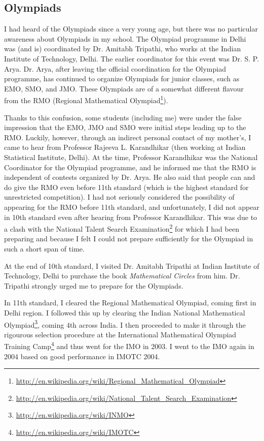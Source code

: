 \documentclass[a4paper]{amsart}
\begin{document}
\subsection{Olympiads}

I had heard of the Olympiads since a very young age, but there was no
particular awareness about Olympiads in my school. The Olympiad
programme in Delhi was (and is) coordinated by Dr. Amitabh Tripathi,
who works at the Indian Institute of Technology, Delhi. The earlier
coordinator for this event was Dr. S. P. Arya. Dr. Arya, after leaving
the official coordination for the Olympiad programme, has continued to
organize Olympiads for junior classes, such as EMO, SMO, and
JMO. These Olympiads are of a somewhat different flavour from the RMO
(Regional Mathematical Olympiad\footnote{\url{http://en.wikipedia.org/wiki/Regional_Mathematical_Olympiad}}).

Thanks to this confusion, some students (including me) were under the
false impression that the EMO, JMO and SMO were initial steps leading up
to the RMO. Luckily, however, through an indirect personal contact of
my mother's, I came to hear from Professor Rajeeva L. Karandhikar
(then working at Indian Statistical Institute, Delhi). At the time,
Professor Karandhikar was the National Coordinator for the Olympiad
programme, and he informed me that the RMO is independent of contests
organized by Dr. Arya. He also said that people can and do give the
RMO even before 11th standard (which is the highest standard for
unrestricted competition).  I had not seriously considered the
possibility of appearing for the RMO before 11th standard, and
unfortunately, I did not appear in 10th standard even after hearing
from Professor Karandhikar. This was due to a clash with the National
Talent Search
Examination\footnote{\url{http://en.wikipedia.org/wiki/National_Talent_Search_Examination}}
for which I had been preparing and because I felt I could not prepare
sufficiently for the Olympiad in such a short span of time.

At the end of 10th standard, I visited Dr. Amitabh Tripathi at Indian
Institute of Technology, Delhi to purchase the book {\em Mathematical
Circles} from him. Dr. Tripathi strongly urged me to prepare for the
Olympiads.

In 11th standard, I cleared the Regional Mathematical Olympiad, coming
first in Delhi region. I followed this up by clearing the Indian
National Mathematical
Olympiad\footnote{\url{http://en.wikipedia.org/wiki/INMO}}, coming 4th
across India. I then proceeded to make it through the rigourous
selection procedure at the International Mathematical Olympiad
Training Camp\footnote{\url{http://en.wikipedia.org/wiki/IMOTC}} and
thus went for the IMO in 2003. I went to the IMO again in 2004 based on good
performance in IMOTC 2004.
\end{document}
